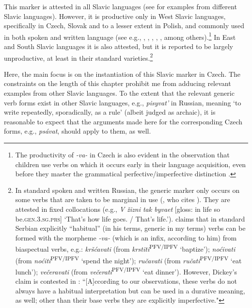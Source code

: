 \documentclass[output=paper,colorlinks,citecolor=brown]{langscibook}
\begin{document}
This marker is attested in all Slavic languages (see \citealt{Genis2021} for examples from different Slavic languages). However, 
it is productive only in West Slavic languages, specifically in Czech, Slovak and to a lesser extent in Polish, and commonly used in both spoken and written language (see e.g., \citealt[62]{sirokova1963}, \citealt[27]{Comrie1976}, \citealt{kucera1981aspect}, \citealt{bily1985preliminaries}, \citealt{bily1986iterative,petr1986mluvnice,Genis2021}, among others).\footnote{The productivity of \textit{-va-} in Czech is also evident in the observation that children use verbs on which it occurs early in their language acquisition, even before they master the grammatical perfective/imperfective distinction \citep{chmelickova2005}.}
In East and South Slavic languages it is also attested, but 
it is reported to be largely unproductive, at least in their standard varieties.\footnote{In standard spoken and written Russian, the generic marker only occurs on some verbs that are taken to be marginal in use (\citealt[fn.~1 on p.~27]{Comrie1976}, who cites \citealt[405--407]{isacenko1962}). They are attested in fixed collocations (e.g., \textit{V žizni tak byvaet} [gloss: in life so be.\textsc{gen.3.sg.prs}] `That's how life goes. / That's life.'). \citet[87]{Dickey2000}
claims that in standard Serbian explicitly ``habitual'' (in his terms, generic in my terms)
verbs can be formed with the morpheme \textit{-va-} (which is an infix, according to him) from biaspectual verbs, e.g.: \textit{kršćavati} (from \textit{krstiti}\textsuperscript{PFV/IPFV} `baptize’); \textit{noćivati}
(from \textit{noćiti}\textsuperscript{PFV/IPFV} `spend the night’); \textit{ručavati} (from \textit{ručati}\textsuperscript{PFV/IPFV} `eat lunch’);
\textit{večeravati} (from \textit{večerati}\textsuperscript{PFV/IPFV} `eat dinner’). However, Dickey's claim is contested in \citet[26]{Genis2021}: ``[A]ccording to our
observations, these verbs do not always have a habitual interpretation but can be
used in a durative meaning, as well; other than their base verbs they are explicitly
imperfective."}

Here, the main focus is on the instantiation of this Slavic marker in Czech. The constraints on the length of this chapter prohibit me from
adducing relevant examples from other Slavic languages. To the extent that the relevant generic verb forms exist in other Slavic languages, e.g., \textit{pisyvat'} in Russian, meaning `to write repeatedly, sporadically, as a rule' (albeit judged as archaic),
it is reasonable to expect that the arguments made here for 
the corresponding Czech forms, e.g., \textit{psávat}, should apply to them, as well. 
\end{document}
